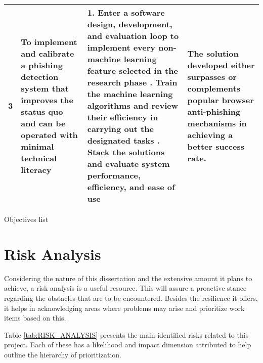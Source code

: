 \begin{landscape}
\begin{singlespace}
\begin{center}
\begin{tabular}{ | m{0.5em} | m{18.5em} | m{23em}| m{16em} | }
				\hline
				\textbf{3}  &
				To implement and calibrate a phishing detection system that improves the status quo and can be operated with minimal technical literacy
				            &
				1. Enter a software design, development, and evaluation loop to implement every non-machine learning feature selected in the research phase \newline\newline
				2. Train the machine learning algorithms and review their efficiency in carrying out the designated tasks \newline\newline
				3. Stack the solutions and evaluate system performance, efficiency, and ease of use
				            &
				The solution developed either surpasses or complements popular browser anti-phishing mechanisms in achieving a better success rate.   \\

				\hline
			\end{tabular}
			\captionsetup{type=table}\caption{Objectives list} 
		\end{center}
	\end{singlespace}
\end{landscape}
\section{Risk Analysis}

Considering the nature of this dissertation and the extensive amount it plans to achieve, a risk analysis is a useful resource. This will assure a proactive stance regarding the obstacles that are to be encountered. Besides the resilience it offers, it helps in acknowledging areas where problems may arise and prioritize work items based on this.

Table \ref{tab:RISK_ANALYSIS} presents the main identified risks related to this project. Each of these has a likelihood and impact dimension attributed to help outline the hierarchy of prioritization.

